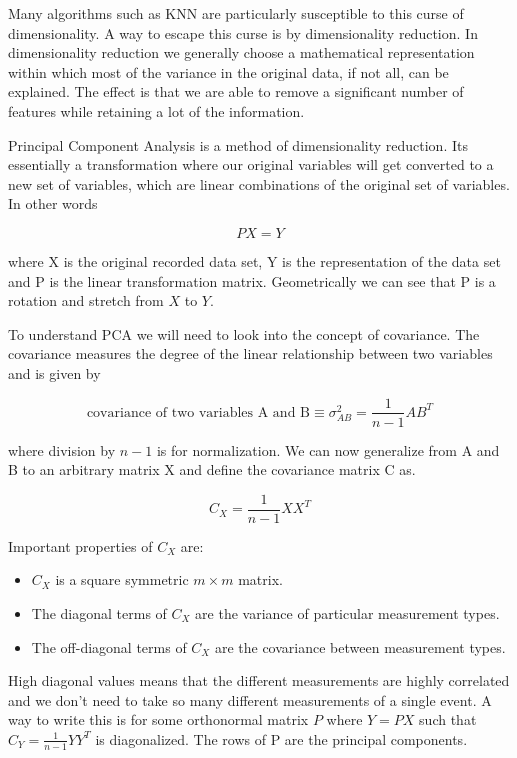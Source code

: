 \documentclass{book}
\begin{document}
Many algorithms such as KNN are particularly susceptible to this curse of dimensionality. A way to escape this curse is by dimensionality reduction. In dimensionality reduction we generally choose a mathematical representation within which most of the variance in the original data, if not all, can be explained. The effect is that we are able to remove a significant number of features while retaining a lot of the information.

Principal Component Analysis is a method of dimensionality reduction. Its essentially a transformation where our original variables will get converted to a new set of variables, which are linear combinations of the original set of variables. In other words

\begin{equation}
	PX = Y
\end{equation}

where X is the original recorded data set, Y is the representation of the data set and P is the linear transformation matrix. Geometrically we can see that P is a rotation and stretch from $X$ to $Y$.

To understand PCA we will need to look into the concept of covariance. The covariance measures the degree of the linear relationship between two variables and is given by

\begin{equation}
	\text{covariance of two variables A and B} \equiv \sigma_{AB}^2 = \frac{1}{n - 1}AB^T
\end{equation}

where division by $n - 1$ is for normalization. We can now generalize from A and B to an arbitrary matrix X and define the covariance matrix C as.

\begin{equation}
	C_X = \frac{1}{n - 1}XX^T
\end{equation}

Important properties of $C_X$ are:

\begin{itemize}
	\item $C_X$ is a square symmetric $m \times m $ matrix.
	\item The diagonal terms of $C_X$ are the variance of particular measurement types.
	\item The off-diagonal terms of $C_X$ are the covariance between measurement types.
\end{itemize}

High diagonal values means that the different measurements are highly correlated and we don't need to take so many different measurements of a single event. A way to write this is for some orthonormal matrix $P$ where $Y = PX$ such that $C_Y = \frac{1}{n - 1}YY^T$ is diagonalized. The rows of P are the principal components.
\end{document}
